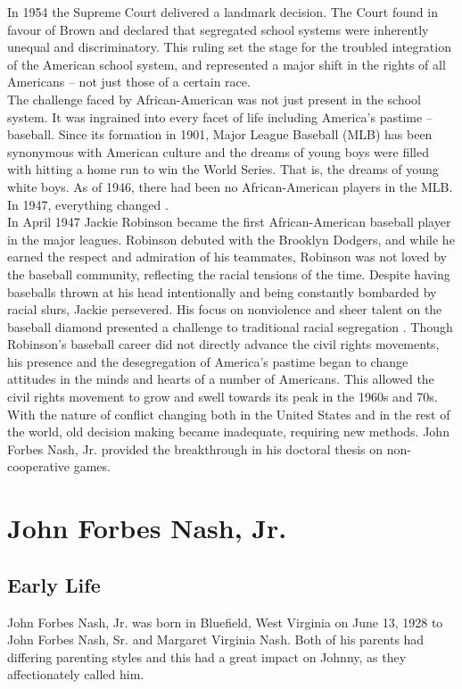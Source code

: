 \documentclass[12pt]{article}
\begin{document}
In 1954 the Supreme Court delivered a landmark decision. The Court found in favour of Brown and declared that segregated school systems were inherently unequal and discriminatory. This ruling set the stage for the troubled integration of the American school system, and represented a major shift in the rights of all Americans – not just those of a certain race.\\

The challenge faced by African-American was not just present in the school system. It was ingrained into every facet of life including America's pastime – baseball. Since its formation in 1901, Major League Baseball (MLB) has been synonymous with American culture and the dreams of young boys were filled with hitting a home run to win the World Series. That is, the dreams of young white boys. As of 1946, there had been no African-American players in the MLB. In 1947, everything changed \cite{22}.\\

In April 1947 Jackie Robinson became the first African-American baseball player in the major leagues. Robinson debuted with the Brooklyn Dodgers, and while he earned the respect and admiration of his teammates, Robinson was not loved by the baseball community, reflecting the racial tensions of the time. Despite having baseballs thrown at his head intentionally and being constantly bombarded by racial slurs, Jackie persevered. His focus on nonviolence and sheer talent on the baseball diamond presented a challenge to traditional racial segregation \cite{23}. Though Robinson's baseball career did not directly advance the civil rights movements, his presence and the desegregation of America's pastime began to change attitudes in the minds and hearts of a number of Americans. This allowed the civil rights movement to grow and swell towards its peak in the 1960s and 70s.\\

With the nature of conflict changing both in the United States and in the rest of the world, old decision making became inadequate, requiring new methods. John Forbes Nash, Jr. provided the breakthrough in his doctoral thesis on non-cooperative games.

\section[John Forbes Nash, Jr.]{John Forbes Nash, Jr. \cite{24}}
\subsection{Early Life}
John Forbes Nash, Jr. was born in Bluefield, West Virginia on June 13, 1928 to John Forbes Nash, Sr. and Margaret Virginia Nash. Both of his parents had differing parenting styles and this had a great impact on Johnny, as they affectionately called him.\\
\end{document}
